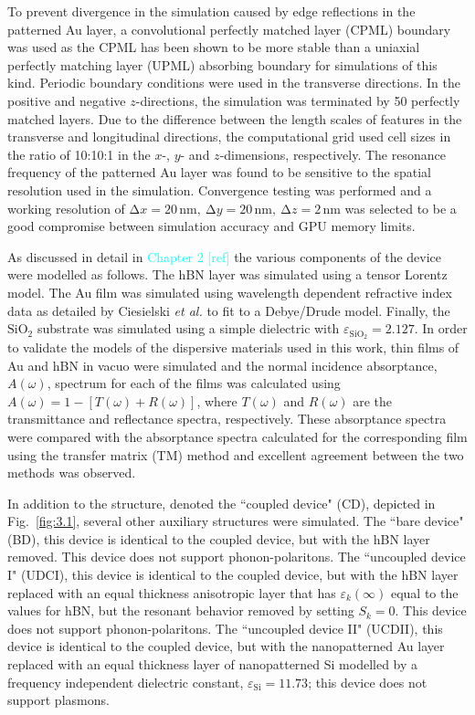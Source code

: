 \documentclass[preprint,
amsmath,amssymb,
aip,
jap,
floatfix,]{revtex4-2}
\begin{document}
		To prevent divergence in the simulation caused by edge reflections in the patterned Au layer, a convolutional perfectly matched layer (CPML) \cite{Gvozdic:17} boundary was used as the CPML has been shown to be more stable than a uniaxial perfectly matching layer (UPML) \cite{Sacks:95} absorbing boundary for simulations of this kind. Periodic boundary conditions were used in the transverse directions. In the positive and negative $z$-directions, the simulation was terminated by 50 perfectly matched layers. Due to the difference between the length scales of features in the transverse and longitudinal directions, the computational grid used cell sizes in the ratio of 10:10:1 in the $x$-, $y$- and $z$-dimensions, respectively. The resonance frequency of the patterned Au layer was found to be sensitive to the spatial resolution used in the simulation. Convergence testing was performed and a working resolution of $\mathrm{\Delta}x = 20 \, \si{\nm}, \ \mathrm{\Delta}y = 20 \, \si{\nm}, \ \mathrm{\Delta}z = 2 \, \si{\nm}$ was selected to be a good compromise between simulation accuracy and GPU memory limits.

		As discussed in detail in \textcolor{cyan}{Chapter 2 [ref]} the various components of the device were modelled as follows. The hBN layer was simulated using a tensor Lorentz model. The Au film was simulated using wavelength dependent refractive index data as detailed by Ciesielski \textit{et al.}  \cite{Ciesielski:18} to fit to a Debye/Drude model. Finally, the $\mathrm{SiO}_{2}$ substrate was simulated using a simple dielectric with $\varepsilon_\mathrm{SiO_2} = 2.127$. In order to validate the models of the dispersive materials used in this work, thin films of Au and hBN in vacuo were simulated and the normal incidence absorptance, $A(\omega)$, spectrum for each of the films was calculated using $A(\omega) = 1 - [T(\omega) + R(\omega)]$, where $T(\omega)$ and $R(\omega)$ are the transmittance and reflectance spectra, respectively. These absorptance spectra were compared with the absorptance spectra calculated for the corresponding film using the transfer matrix (TM) method \cite{MacLeod:01} and excellent agreement between the two methods was observed.

		In addition to the structure, denoted the ``coupled device" (CD), depicted in Fig.~\ref{fig:3.1}, several other auxiliary structures were simulated. The ``bare device" (BD), this device is identical to the coupled device, but  with the hBN layer removed. This device does not support phonon-polaritons. The  ``uncoupled device I" (UDCI), this device is identical to the coupled device, but  with the hBN layer replaced with an equal thickness anisotropic layer that has $\varepsilon_{k}(\infty)$ equal to the values for hBN, but the resonant behavior removed by setting $S_{k} = 0$. This device does not support phonon-polaritons. The ``uncoupled device II" (UCDII), this device is identical to the coupled device, but with the nanopatterned Au layer replaced with an equal thickness layer of nanopatterned Si modelled by a frequency independent dielectric constant, $\varepsilon_\mathrm{Si} = 11.73$; this device does not support plasmons.
		
\end{document}
